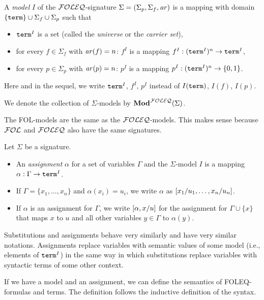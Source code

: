 \begin{definition}[Models]\label{def:fol:model}
A \emph{model} $I$ of the ${\mathcal{FOLEQ}}$-signature $\Sigma=(\Sigma_p,\Sigma_f,\mathit{ar})$ is a mapping with domain $\{\mathtt{term}\}\cup\Sigma_f\cup\Sigma_p$ such that
\begin{itemize}
\item $\mathtt{term}^I$ is a set (called the \emph{universe} or the \emph{carrier set}),
\item for every $f\in\Sigma_f$ with $\mathit{ar}(f)=n$: $f^I$ is a mapping $f^I:(\mathtt{term}^I)^n\rightarrow \mathtt{term}^I$,
\item for every $p\in\Sigma_p$ with $\mathit{ar}(p)=n$: $p^I$ is a mapping $p^I:(\mathtt{term}^I)^n\rightarrow \{0,1\}$.
\end{itemize}
Here and in the sequel, we write $\mathtt{term}^I$, $f^I$, $p^I$ instead of $I(\mathtt{term})$, $I(f)$, $I(p)$.

We denote the collection of $\Sigma$-models by ${\mathbf{Mod}^{}}^{{\mathcal{FOLEQ}}}(\Sigma)$.
\end{definition}

The FOL-models are the same as the ${\mathcal{FOLEQ}}$-models.
This makes sense because ${\mathcal{FOL}}$ and ${\mathcal{FOLEQ}}$ also have the same signatures.

\begin{definition}[Assignments]
Let $\Sigma$ be a signature.
\begin{itemize}
\item An \emph{assignment} $\alpha$ for a set of variables $\Gamma$ and the $\Sigma$-model $I$ is a mapping $\alpha:\Gamma\rightarrow \mathtt{term}^I$.
\item If $\Gamma=\{x_1,\ldots,x_n\}$ and $\alpha(x_i)=u_i$, we write $\alpha$ as $[x_1/u_1,\ldots,x_n/u_n]$.
\item If $\alpha$ is an assignment for $\Gamma$, we write $[\alpha,x/u]$ for the assignment for $\Gamma\cup\{x\}$ that maps $x$ to $u$ and all other variables $y\in\Gamma$ to $\alpha(y)$.
\end{itemize}
\end{definition}

\begin{remark}
Substitutions and assignments behave very similarly and have very similar notations.
Assignments replace variables with semantic values of some model (i.e., elements of $\mathtt{term}^I$) in the same way in which substitutions replace variables with syntactic terms of some other context.
\end{remark}

If we have a model and an assignment, we can define the semantics of FOLEQ-formulas and terms.
The definition follows the inductive definition of the syntax.

